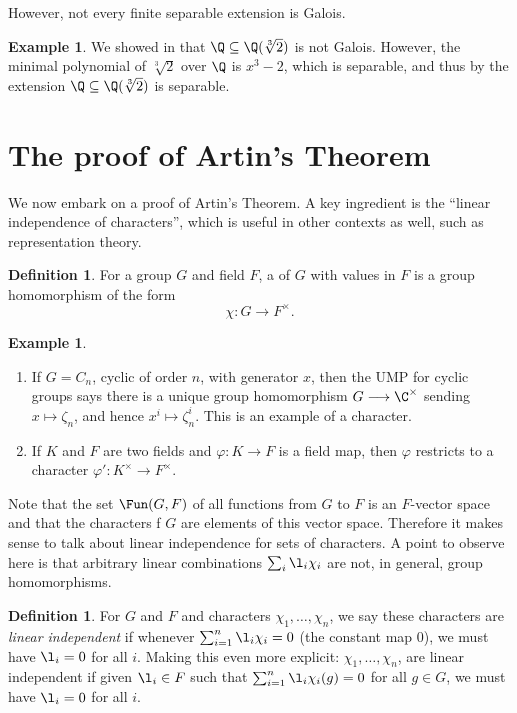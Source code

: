 \documentclass[12pt]{amsart}
\theoremstyle{definition}
\newtheorem{definition}[theorem]{Definition}
\newtheorem{example}[theorem]{Example}
\numberwithin{equation}{theorem}
\def\phi{\varphi}
\def\to{\longrightarrow}
\def\mapsto{\longmapsto}
\begin{document}
However, not every finite separable extension is Galois.

\begin{example}
	We showed in  that $\Q \subseteq \Q(\sqrt[3]{2})$ is not Galois. However, the minimal polynomial of $\sqrt[3]{2}$ over $\Q$ is $x^3-2$, which is separable, and thus by  the extension $\Q \subseteq \Q(\sqrt[3]{2})$ is separable.
\end{example}




\section{The proof of Artin's Theorem}

We now embark on a proof of Artin's Theorem. A key ingredient is the ``linear independence of characters'', which is useful in other contexts as well, such as representation theory.

\begin{definition}
For a group $G$ and field $F$, a  of $G$ with values in $F$ is a group homomorphism of the form
$$\chi: G \to F^\times.$$
\end{definition}



\begin{example}$\,$
\begin{enumerate}[label=\arabic*)]
\item If $G = C_n$, cyclic of order $n$, with generator $x$, then the UMP for cyclic groups says there is a unique group homomorphism  $G \to \C^\times$ sending $x\mapsto \zeta_n$, and hence $x^i \mapsto \zeta_n^i$. This is an example of a character.

\item If $K$ and $F$ are two fields and $\phi: K \to F$ is a field map, then $\phi$ restricts to a character $\phi': K^\times \to F^\times$.
\end{enumerate}
\end{example}


Note that the set $\Fun(G,F)$ of all functions from $G$ to $F$ is an $F$-vector space and that the characters f $G$ are elements of this vector space. Therefore it makes sense to talk about linear independence for sets of characters. A point to observe here is that arbitrary linear combinations  $\sum_i \l_i \chi_i$ are not, in general, group homomorphisms.

\begin{definition}
For $G$ and $F$ and characters $\chi_1, \dots, \chi_n$, we say these
characters are {\em linear independent} if whenever
$\sum_{i=1}^n \l_i \chi_i=0$  (the constant map $0$), we must have $\l_i
= 0$ for all $i$. Making this even more explicit:
$\chi_1, \dots, \chi_n$,
are linear independent if given $\l_i \in F$ such that $\sum_{i=1}^n \l_i
\chi_i(g) = 0$ for all $g \in G$, we must have $\l_i = 0$ for all $i$.
\end{definition}
\end{document}
